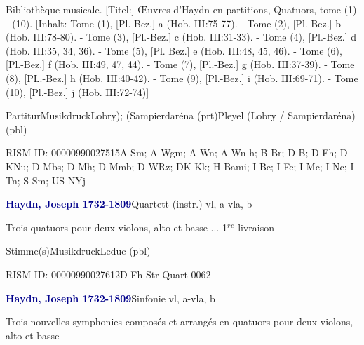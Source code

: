 \documentclass[twocolumn]{book}
\begin{document}
\par \begin{itshape}[Umschlagtitel:] Bibliothèque musicale. [Titel:] Œuvres d'Haydn en partitions, Quatuors, tome (1) - (10). [Inhalt: Tome (1), [Pl. Bez.] a (Hob. III:75-77). - Tome (2), [Pl.-Bez.] b (Hob. III:78-80). - Tome (3), [Pl.-Bez.] c (Hob. III:31-33). - Tome (4), [Pl.-Bez.] d (Hob. III:35, 34, 36). - Tome (5), [Pl. Bez.] e (Hob. III:48, 45, 46). - Tome (6), [Pl.-Bez.] f (Hob. III:49, 47, 44). - Tome (7), [Pl.-Bez.] g (Hob. III:37-39). - Tome (8), [PL.-Bez.] h (Hob. III:40-42). - Tome (9), [Pl.-Bez.] i (Hob. III:69-71). - Tome (10), [Pl.-Bez.] j (Hob. III:72-74)]\end{itshape} 
\par \textcolor{darkblue}{}  Partitur\newline Musikdruck\newline Lobry); (Sampierdaréna  (prt)\newline Pleyel (Lobry / Sampierdaréna)  (pbl)
\par RISM-ID: 00000990027515\newline A-Sm; A-Wgm; A-Wn; A-Wn-h; B-Br; D-B; D-Fh; D-KNu; D-Mbs; D-Mh; D-Mmb; D-WRz; DK-Kk; H-Bami; I-Bc; I-Fc; I-Mc; I-Nc; I-Tn; S-Sm; US-NYj
\par \vspace{7pt} \textcolor{darkblue}{\textbf{Haydn, Joseph  1732-1809}}\hfillplus{\textbf{[284]}}\newline Quartett (instr.) vl, a-vla, b
\par \begin{itshape}Trois quatuors pour deux violons, alto et basse ... 1$^r$$^e$ livraison\end{itshape} 
\par \textcolor{darkblue}{}  Stimme(s)\newline Musikdruck\newline Leduc  (pbl)
\par RISM-ID: 00000990027612\newline D-Fh  Str Quart 0062
\par \vspace{7pt} \textcolor{darkblue}{\textbf{Haydn, Joseph  1732-1809}}\hfillplus{\textbf{[285]}}\newline Sinfonie vl, a-vla, b
\par \begin{itshape}Trois nouvelles symphonies composés et arrangés en quatuors pour deux violons, alto et basse\end{itshape} 
\end{document}
